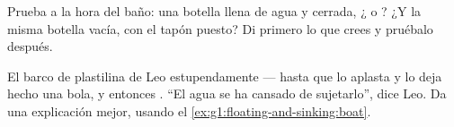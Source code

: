 \begin{exercise}[$\star$]\label{exo:g1:floating-and-sinking:8}
Prueba a la hora del baño: una botella llena de agua y cerrada,
¿ o ? ¿Y la misma botella vacía, con el tapón
puesto? Di primero lo que crees y pruébalo después.
\end{exercise}

\begin{exercise}[$\star\star$]\label{exo:g1:floating-and-sinking:9}
El barco de plastilina de Leo  estupendamente --- hasta que lo
aplasta y lo deja hecho una bola, y entonces . ``El agua se
ha cansado de sujetarlo'', dice Leo. Da una explicación mejor, usando
el \cref{ex:g1:floating-and-sinking:boat}.
\end{exercise}
